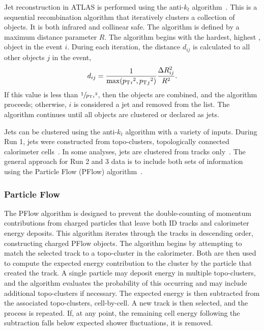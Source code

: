 Jet reconstruction in ATLAS is performed using the anti-$k_t$ algorithm~\cite{AntiKt}.
This is a sequential recombination algorithm that iteratively clusters a collection of objects.
It is both infrared and collinear safe.
The algorithm is defined by a maximum distance parameter $R$.
The algorithm begins with the hardest, highest \pt, object in the event $i$.
During each iteration, the distance $d_{ij}$ is calculated to all other objects $j$ in the event,
\begin{equation}
    d_{ij} = \frac{1}{\max(p_\mathrm{T}{_i}^2, p_\mathrm{T}{_j}^2)} \frac{\Delta R_{ij}^2}{R^2}.
\end{equation}
If this value is less than $\sfrac{1}{p_\mathrm{T}{_i}^2}$, then the objects are combined, and the algorithm proceeds; otherwise, $i$ is considered a jet and removed from the list.
The algorithm continues until all objects are clustered or declared as jets.

Jets can be clustered using the anti-$k_t$ algorithm with a variety of inputs.
During Run 1, jets were constructed from topo-clusters, topologically connected calorimeter cells~\cite{TopoJets}.
In some analyses, jets are clustered from tracks only~\cite{TrackJets}.
The general approach for Run 2 and 3 data is to include both sets of information using the Particle Flow (PFlow) algorithm~\cite{PFlow}.

\subsubsection{Particle Flow}

The PFlow algorithm is designed to prevent the double-counting of momentum contributions from charged particles that leave both ID tracks and calorimeter energy deposits.
This algorithm iterates through the tracks in descending \pt order, constructing charged PFlow objects.
The algorithm begins by attempting to match the selected track to a topo-cluster in the calorimeter.
Both are then used to compute the expected energy contribution to the cluster by the particle that created the track.
A single particle may deposit energy in multiple topo-clusters, and the algorithm evaluates the probability of this occurring and may include additional topo-clusters if necessary.
The expected energy is then subtracted from the associated topo-clusters, cell-by-cell.
A new track is then selected, and the process is repeated.
If, at any point, the remaining cell energy following the subtraction falls below expected shower fluctuations, it is removed.

